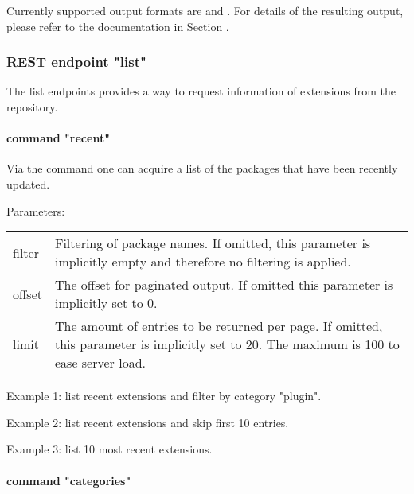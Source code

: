 Currently supported output formats are  and . For details of the resulting output, please refer to the documentation in Section .

\subsubsection[sec:repository rest api endpoint list]{REST endpoint "list"}

The list endpoints provides a way to request information of extensions from the repository.

\paragraph{command "recent"}

Via the  command one can acquire a list of the packages that have been recently updated.

Parameters:\\
\begin{tabular}{lp{}}\\
filter & Filtering of package names. If omitted, this parameter is implicitly empty and therefore no filtering is applied.\\ 
offset & The offset for paginated output. If omitted this parameter is implicitly set to 0. \\ 
limit & The amount of entries to be returned per page. If omitted, this parameter is implicitly set to 20. The maximum is 100 to ease server load.
\end{tabular}

\vspace{.5cm}
Example 1: list recent extensions and filter by category "plugin".\\
\vspace{.5cm}

Example 2: list recent extensions and skip first 10 entries.\\
\vspace{.5cm}

Example 3: list 10 most recent extensions.\\
\vspace{.5cm}

\paragraph{command "categories"}

